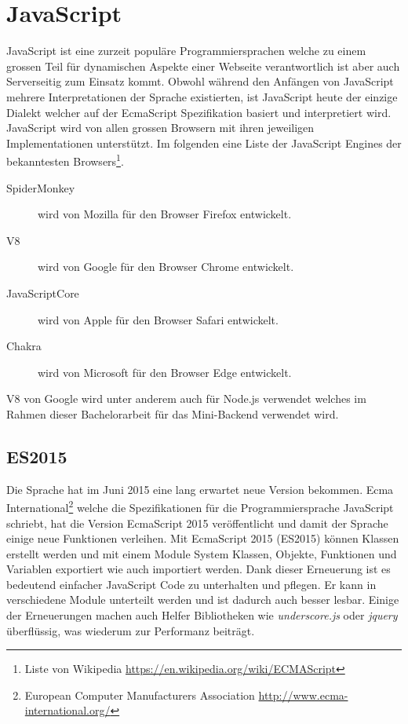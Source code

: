 \section{JavaScript}
JavaScript ist eine zurzeit populäre Programmiersprachen welche zu einem grossen Teil für dynamischen Aspekte einer Webseite verantwortlich ist aber auch Serverseitig zum Einsatz kommt. Obwohl während den Anfängen von JavaScript mehrere Interpretationen der Sprache existierten, ist JavaScript heute der einzige Dialekt welcher auf der EcmaScript Spezifikation basiert und interpretiert wird. JavaScript wird von allen grossen Browsern mit ihren jeweiligen Implementationen unterstützt. Im folgenden eine Liste der JavaScript Engines der bekanntesten Browsers\footnote{Liste von Wikipedia \url{https://en.wikipedia.org/wiki/ECMAScript}}.
\begin{description}
	\item[SpiderMonkey] wird von Mozilla für den Browser Firefox entwickelt.
	\item[V8] wird von Google für den Browser Chrome entwickelt.
	\item[JavaScriptCore] wird von Apple für den Browser Safari entwickelt.
	\item[Chakra] wird von Microsoft für den Browser Edge entwickelt.
\end{description}
V8 von Google wird unter anderem auch für Node.js verwendet welches im Rahmen dieser Bachelorarbeit für das Mini-Backend verwendet wird.

\subsection{ES2015}
Die Sprache hat im Juni 2015 eine lang erwartet neue Version bekommen. Ecma International\footnote{European Computer Manufacturers Association \url{http://www.ecma-international.org/}} welche die Spezifikationen für die Programmiersprache JavaScript schriebt, hat die Version EcmaScript 2015 veröffentlicht und damit der Sprache einige neue Funktionen verleihen. Mit EcmaScript 2015 (ES2015) können Klassen erstellt werden und mit einem Module System Klassen, Objekte, Funktionen und Variablen exportiert wie auch importiert werden. Dank dieser Erneuerung ist es bedeutend einfacher JavaScript Code zu unterhalten und pflegen. Er kann in verschiedene Module unterteilt werden und ist dadurch auch besser lesbar. Einige der Erneuerungen machen auch Helfer Bibliotheken wie \textit{underscore.js} oder \textit{jquery} überflüssig, was wiederum zur Performanz beiträgt.

